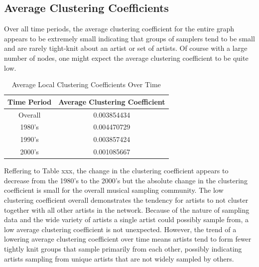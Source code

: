 \documentclass[pageno]{jpaper}
\begin{document}
\subsection{Average Clustering Coefficients}
Over all time periods, the average clustering coefficient for the entire graph appears to be extremely small indicating that groups of samplers tend to be small and are rarely tight-knit about an artist or set of artists. Of course with a large number of nodes, one might expect the average clustering coefficient to be quite low.
\begin{table}[H]
\centering
\begin{tabular}{|c|c|}
\hline
\textbf{Time Period} & \textbf{Average Clustering Coefficient} \\ \hline
Overall & 0.003854434 \\ \hline
1980's & 0.004470729 \\ \hline
1990's & 0.003857424 \\ \hline
2000's & 0.001085667 \\ \hline
\end{tabular}
\caption{Average Local Clustering Coefficients Over Time}
\label{my-label}
\end{table}
Reffering to Table xxx, the change in the clustering coefficient appears to decrease from the 1980's to the 2000's but the absolute change in the clustering coefficient is small for the overall musical sampling community. The low clustering coefficient overall demonstrates the tendency for artists to not cluster together with all other artists in the network. Because of the nature of sampling data and the wide variety of artists a single artist could possibly sample from, a low average clustering coefficient is not unexpected. However, the trend of a lowering average clustering coefficient over time means artists tend to form fewer tightly knit groups that sample primarily from each other, possibly indicating artists sampling from unique artists that are not widely sampled by others.
\end{document}
